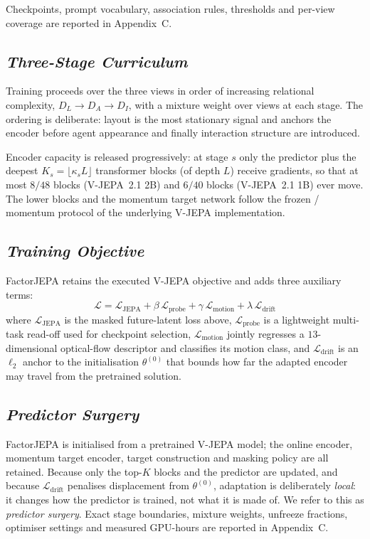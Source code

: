 Checkpoints, prompt vocabulary, association rules, thresholds and per-view
coverage are reported in Appendix~C.

\subsection{\textbf{\emph{Three-Stage Curriculum}}}

Training proceeds over the three views in order of increasing relational complexity,
$D_L\rightarrow D_A\rightarrow D_I$, with a mixture weight over views at each stage. The
ordering is deliberate: layout is the most stationary signal and anchors the encoder before
agent appearance and finally interaction structure are introduced.

Encoder capacity is released progressively: at stage $s$ only the predictor plus the
deepest $K_s=\lfloor \kappa_s L\rfloor$ transformer blocks (of depth $L$) receive
gradients, so that at most $8/48$ blocks (V-JEPA~2.1 2B) and $6/40$ blocks (V-JEPA~2.1 1B) ever move. The lower blocks and the momentum target network follow the frozen / momentum
protocol of the underlying V-JEPA implementation.

\subsection{\textbf{\emph{Training Objective}}}

FactorJEPA retains the executed V-JEPA objective and adds three auxiliary terms:
\begin{equation*}
\boxed{
\mathcal L=\mathcal L_{\mathrm{JEPA}}
+\beta\,\mathcal L_{\mathrm{probe}}
+\gamma\,\mathcal L_{\mathrm{motion}}
+\lambda\,\mathcal L_{\mathrm{drift}} }
\end{equation*}
where $\mathcal L_{\mathrm{JEPA}}$ is the masked future-latent loss above,
$\mathcal L_{\mathrm{probe}}$ is a lightweight multi-task read-off used for checkpoint
selection, $\mathcal L_{\mathrm{motion}}$ jointly regresses a $13$-dimensional optical-flow
descriptor and classifies its motion class, and $\mathcal L_{\mathrm{drift}}$ is an
$\ell_2$ anchor to the initialisation $\theta^{(0)}$ that bounds how far the adapted encoder
may travel from the pretrained solution.

\subsection{\textbf{\emph{Predictor Surgery}}}

FactorJEPA is initialised from a pretrained V-JEPA model; the online encoder, momentum target
encoder, target construction and masking policy are all retained. Because only the top-$K$
blocks and the predictor are updated, and because $\mathcal L_{\mathrm{drift}}$ penalises
displacement from $\theta^{(0)}$, adaptation is deliberately \emph{local}: it changes how the predictor
is trained, not what it is made of. We refer to this as
\emph{predictor surgery}. Exact stage boundaries, mixture
weights, unfreeze fractions, optimiser settings and measured GPU-hours are reported in
Appendix~C.

